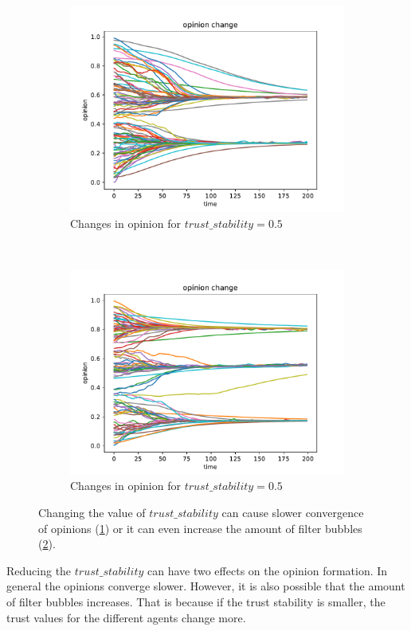 \documentclass[11pt]{article}
\begin{document}
\begin{figure}[H]
    \begin{subfigure}[t]{0.5\textwidth}
    \includegraphics[width = \linewidth]{img/trust_stability_1.pdf}
    \caption{Changes in opinion for $trust\_stability=0.5$}\label{sfig:trust1}
    \end{subfigure}
    ~
    \begin{subfigure}[t]{0.5\textwidth}
    \includegraphics[width = \linewidth]{img/trust_stability_2.pdf}
    \caption{Changes in opinion for $trust\_stability=0.5$}\label{sfig:trust2}
    \end{subfigure}
    \caption{Changing the value of $trust\_stability$ can cause slower convergence of opinions (\ref{sfig:trust1}) or it can even increase the amount of filter bubbles (\ref{sfig:trust2}).}\label{sfig:trust}
\end{figure}
Reducing the $trust\_stability$ can have two effects on the opinion formation. In general the opinions converge slower. However, it is also possible that the amount of filter bubbles increases. That is because if the trust stability is smaller, the trust values for the different agents change more.
\end{document}
